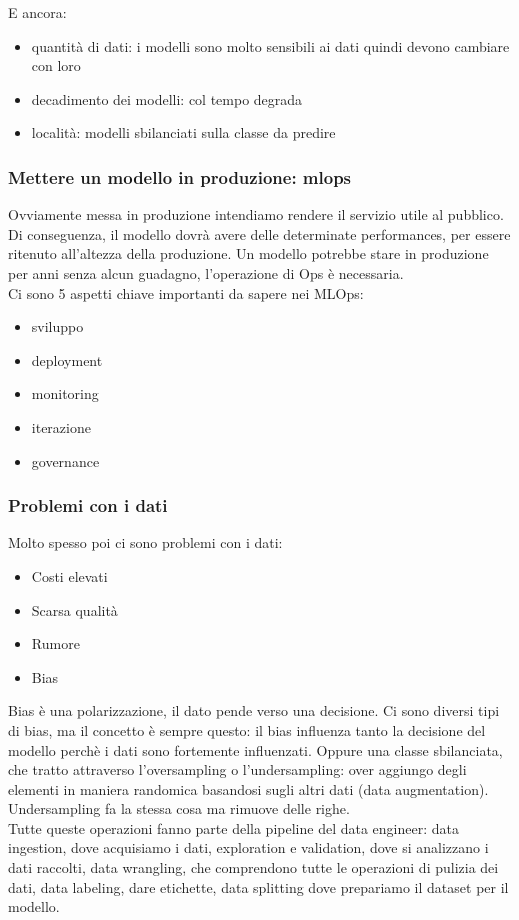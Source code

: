 E ancora: 
\begin{itemize}
    \item quantità di dati: i modelli sono molto sensibili ai dati quindi devono cambiare con loro
    \item decadimento dei modelli: col tempo degrada
    \item località: modelli sbilanciati sulla classe da predire
\end{itemize}

\subsubsection{Mettere un modello in produzione: mlops}
Ovviamente messa in produzione intendiamo rendere il servizio utile al pubblico. Di conseguenza, il modello dovrà avere delle determinate performances, per essere ritenuto all'altezza della produzione. Un modello potrebbe stare in produzione per anni senza alcun guadagno, l'operazione di Ops è necessaria. 
\\
Ci sono 5 aspetti chiave importanti da sapere nei MLOps:
\begin{itemize}
    \item sviluppo
    \item deployment
    \item monitoring
    \item iterazione
    \item governance
\end{itemize}

\subsubsection{Problemi con i dati}
Molto spesso poi ci sono problemi con i dati:
\begin{itemize}
    \item Costi elevati
    \item Scarsa qualità 
    \item Rumore
    \item Bias  
\end{itemize}
Bias è una polarizzazione, il dato pende verso una decisione. Ci sono diversi tipi di bias, ma il concetto è sempre questo: il bias influenza tanto la decisione del modello perchè i dati sono fortemente influenzati. Oppure una classe sbilanciata, che tratto attraverso l'oversampling o l'undersampling: over aggiungo degli elementi in maniera randomica basandosi sugli altri dati (data augmentation). Undersampling fa la stessa cosa ma rimuove delle righe. 
\\
Tutte queste operazioni fanno parte della pipeline del data engineer: data ingestion, dove acquisiamo i dati, exploration e validation, dove si analizzano i dati raccolti, data wrangling, che comprendono tutte le operazioni di pulizia dei dati, data labeling, dare etichette, data splitting dove prepariamo il dataset per il modello. 

